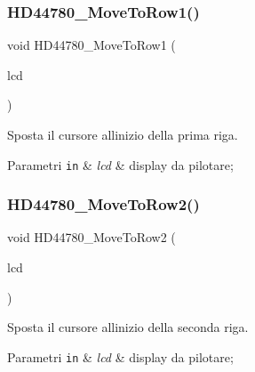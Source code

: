 \subsubsection{\texorpdfstring{H\+D44780\+\_\+\+Move\+To\+Row1()}{HD44780\_MoveToRow1()}}
{\footnotesize\ttfamily void H\+D44780\+\_\+\+Move\+To\+Row1 (\begin{DoxyParamCaption}\item[{\hyperlink{struct_h_d44780___l_c_d__t}{H\+D44780\+\_\+\+L\+C\+D\+\_\+t} $\ast$}]{lcd }\end{DoxyParamCaption})}



Sposta il cursore all\textquotesingle{}inizio della prima riga. 


\begin{DoxyParams}[1]{Parametri}
\mbox{\tt in}  & {\em lcd} & display da pilotare; \\
\hline
\end{DoxyParams}
\mbox{\label{group___h_d44780_ga713670d498b6f5d50a174df19081c515}} 
\subsubsection{\texorpdfstring{H\+D44780\+\_\+\+Move\+To\+Row2()}{HD44780\_MoveToRow2()}}
{\footnotesize\ttfamily void H\+D44780\+\_\+\+Move\+To\+Row2 (\begin{DoxyParamCaption}\item[{\hyperlink{struct_h_d44780___l_c_d__t}{H\+D44780\+\_\+\+L\+C\+D\+\_\+t} $\ast$}]{lcd }\end{DoxyParamCaption})}



Sposta il cursore all\textquotesingle{}inizio della seconda riga. 


\begin{DoxyParams}[1]{Parametri}
\mbox{\tt in}  & {\em lcd} & display da pilotare; \\
\hline
\end{DoxyParams}
\mbox{\label{group___h_d44780_ga3aedff8e2040e62db569fde955d3987b}} 
